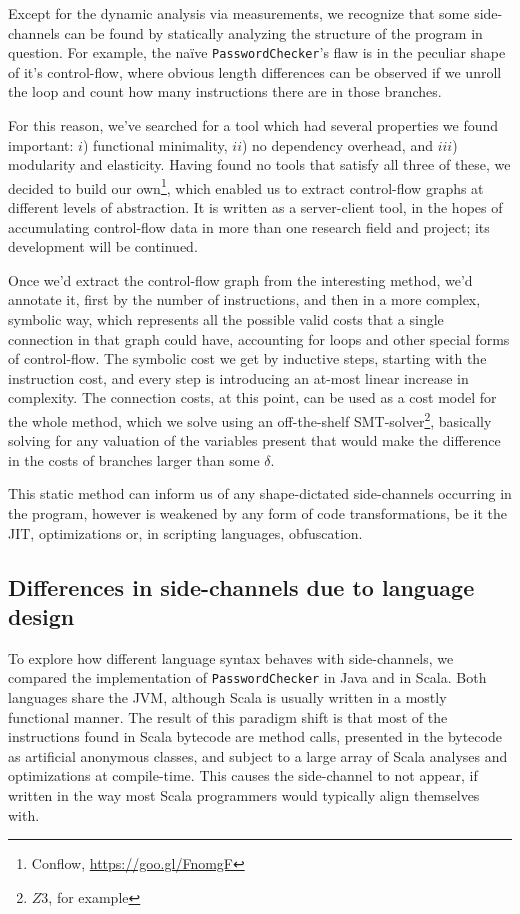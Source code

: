 \documentclass{article}
\begin{document}
Except for the dynamic analysis via measurements, we recognize that some side-channels can be found by 
statically analyzing the structure of the program in question. For example, the na\"ive 
\texttt{PasswordChecker}'s flaw is in the peculiar shape of it's control-flow, where obvious length
differences can be observed if we unroll the loop and count how many instructions there are in those
branches. 

For this reason, we've searched for a tool which had several properties we found important: $i$) functional minimality, $ii$) no dependency overhead, and $iii$) modularity and elasticity. Having found no tools that satisfy all three of these, we decided to build our own\footnote{Conflow, \href{https://goo.gl/FnomgF}{https://goo.gl/FnomgF}}, which enabled us to extract control-flow graphs at different levels of abstraction. It is written as a server-client tool, in the hopes of accumulating control-flow data in more than one research field and project; its development will be continued.

Once we'd extract the control-flow graph from the interesting method, we'd annotate it, first by the number of instructions, and then in a more complex, symbolic way, which represents all the possible valid costs that a single connection in that graph could have, accounting for loops and other special forms of control-flow. The symbolic cost we get by inductive steps, starting with the instruction cost, and every step is introducing an at-most linear increase in complexity. The connection costs, at this point, can be used as a cost model for the whole method, which we solve using an off-the-shelf SMT-solver\footnote{$Z3$, for example}, basically solving for any valuation of the variables present that would make the difference in the costs of branches larger than some $\delta$.


This static method can inform us of any shape-dictated side-channels occurring in the program, however is weakened by any form of code transformations, be it the JIT, optimizations or, in scripting languages, obfuscation.

\subsection{Differences in side-channels due to language design}

To explore how different language syntax behaves with side-channels, we compared the implementation of \texttt{PasswordChecker} in Java and in Scala. Both languages share the JVM, although Scala is usually written in a mostly functional manner. The result of this paradigm shift is that most of the instructions found in Scala bytecode are method calls, presented in the bytecode as artificial anonymous classes, and subject to a large array of Scala analyses and optimizations at compile-time. This causes the side-channel to not appear, if written in the way most Scala programmers would typically align themselves with.
\end{document}
